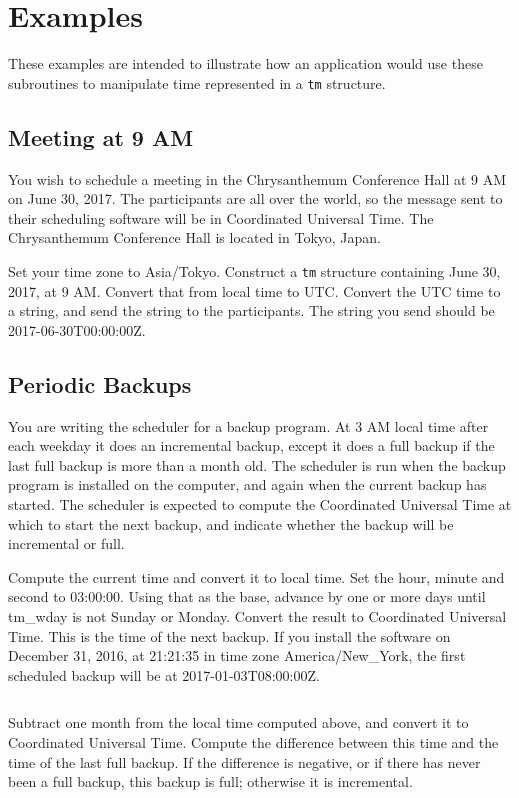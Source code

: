 \documentclass[letterpaper,twoside]{article}
\begin{document}
\section{Examples}
These examples are intended to illustrate how an application would
use these subroutines to manipulate time represented in a \verb|tm| structure.

\subsection{Meeting at 9 AM}
You wish to schedule a meeting in the Chrysanthemum Conference Hall
at 9 AM on June 30, 2017.  The participants are all over the world,
so the message sent to their scheduling software will be in
Coordinated Universal Time.  The Chrysanthemum Conference Hall
is located in Tokyo, Japan.

Set your time zone to Asia/Tokyo.  Construct a \verb|tm| structure
containing June 30, 2017, at 9 AM.  Convert that from local time to UTC.
Convert the UTC time to a string, and send the string to
the participants.  The string you send should be 2017-06-30T00:00:00Z.

\subsection{Periodic Backups}
You are writing the scheduler for a backup program.  At 3 AM
local time
after each weekday it does an incremental backup,
except it does a full backup if the last full backup is more
than a month old.  The scheduler is run when the backup program
is installed on the computer, and again when
the current backup has started.  The scheduler is expected
to compute the Coordinated Universal Time at which to start
the next backup, and indicate whether the backup will be
incremental or full.

Compute the current time and convert it to local time.
Set the hour, minute and second to 03:00:00.
Using that as the base, advance by one or more days
until tm\_wday is not Sunday or Monday.  Convert the result
to Coordinated Universal Time.  This is the time of the
next backup.  If you install the software on December 31, 2016,
at 21:21:35 in time zone America/New\_York, the first
scheduled backup will be at 2017-01-03T08:00:00Z.
\inputminted[firstline=44,lastline=76]{c}{example_02.c}

Subtract one month from the local time computed above, and
convert it to Coordinated Universal Time.  Compute the
difference between this time and the time of the last
full backup.  If the difference is negative, or if there
has never been a full backup, this backup is full;
otherwise it is incremental.
\inputminted[firstline=78,lastline=94]{c}{example_02.c}
\end{document}
